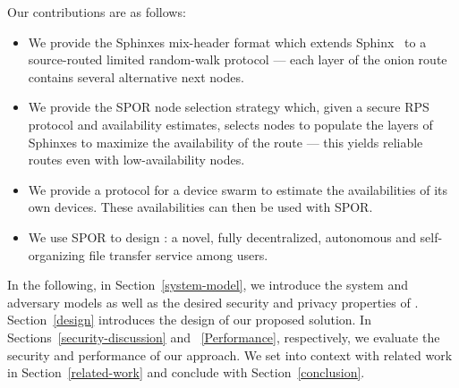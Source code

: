 Our contributions are as follows: 
\begin{itemize}

  \item We provide the Sphinxes mix-header format which extends 
    Sphinx~\cite{Sphinx} to a source-routed limited random-walk protocol --- 
    \ie each layer of the onion route contains several alternative next nodes.

  \item We provide the \ac{SPOR} node selection strategy which, given a secure 
    \ac{RPS} protocol and availability estimates, selects nodes to populate the 
    layers of Sphinxes to maximize the availability of the route --- this 
    yields reliable routes even with low-availability nodes.

  \item We provide a protocol for a device swarm to estimate the availabilities 
    of its own devices.
    These availabilities can then be used with \ac{SPOR}.

  \item We use \ac{SPOR} to design \name: a novel, fully decentralized, 
    autonomous and self-organizing file transfer service among users.

\end{itemize}

In the following, in Section~\ref{system-model}, we introduce the
system and adversary models as well as the desired security and privacy properties of \name. Section~\ref{design}
introduces the design of our proposed solution. In
Sections~\ref{security-discussion} and ~\ref{Performance},
respectively, we evaluate the security and performance of our
approach. We set \name into context with related work in
Section~\ref{related-work} and conclude with Section~\ref{conclusion}.

